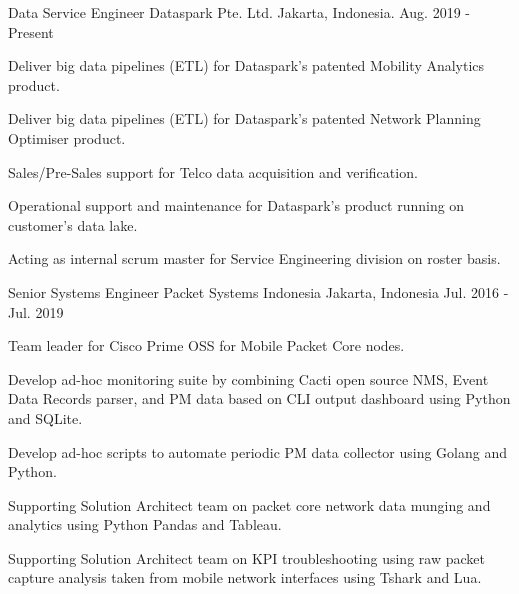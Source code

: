 

\begin{cventries}

\cventry
{Data Service Engineer} %
{Dataspark Pte. Ltd.} %
{Jakarta, Indonesia.} %
{Aug. 2019 - Present} %
{
  \begin{cvitems} %
    \item {Deliver big data pipelines (ETL) for Dataspark's patented Mobility Analytics product.}
    \item {Deliver big data pipelines (ETL) for Dataspark's patented Network Planning Optimiser product.}
    \item {Sales/Pre-Sales support for Telco data acquisition and verification.}
    \item {Operational support and maintenance for Dataspark's product running on customer's data lake.}
    \item {Acting as internal scrum master for Service Engineering division on roster basis.}
  \end{cvitems}
}

  \cventry
    {Senior Systems Engineer} %
    {Packet Systems Indonesia} %
    {Jakarta, Indonesia} %
    {Jul. 2016 - Jul. 2019} %
    {
      \begin{cvitems} %
        \item {Team leader for Cisco Prime OSS for Mobile Packet Core nodes.}
        \item {Develop ad-hoc monitoring suite by combining Cacti open source NMS, Event Data Records parser, and PM data based on CLI output dashboard using Python and SQLite.}
        \item {Develop ad-hoc scripts to automate periodic PM data collector using Golang and Python.}
        \item {Supporting Solution Architect team on packet core network data munging and analytics using Python Pandas and Tableau.}
        \item {Supporting Solution Architect team on KPI troubleshooting using raw packet capture analysis taken from mobile network interfaces using Tshark and Lua.}
      \end{cvitems}
    }


\end{cventries}
